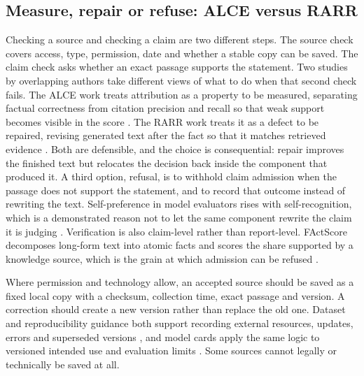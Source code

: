 \subsection{Measure, repair or refuse: ALCE versus RARR}

Checking a source and checking a claim are two different steps. The source check covers access,
type, permission, date and whether a stable copy can be saved. The claim check asks whether an
exact passage supports the statement. Two studies by overlapping authors take different views of
what to do when that second check fails. The ALCE work treats attribution as a property to be measured, separating factual
correctness from citation precision and recall so that weak support becomes visible in the score
\citep{gao2023alce}. The RARR work treats it as a defect to be repaired, revising generated text
after the fact so that it matches retrieved evidence \citep{gao2023rarr}. Both are defensible,
and the choice is consequential: repair improves the finished text but relocates the decision
back inside the component that produced it. A third option, refusal, is to withhold claim
admission when the passage does not support the statement, and to record that outcome instead of
rewriting the text. Self-preference in model evaluators rises with self-recognition, which is a
demonstrated reason not to let the same component rewrite the claim it is judging
\citep{panickssery2024selfpref,pineau2021reproducibility}. Verification is also claim-level
rather than report-level. FActScore decomposes long-form text into atomic facts and scores the
share supported by a knowledge source, which is the grain at which admission can be refused
\citep{min2023factscore,gao2023alce}.

Where permission and technology allow, an accepted source should be saved as a fixed local copy
with a checksum, collection time, exact passage and version. A correction should create a new
version rather than replace the old one. Dataset and reproducibility guidance both support
recording external resources, updates, errors and superseded versions
\citep{gebru2021datasheets,pineau2021reproducibility}, and model cards apply the same logic to
versioned intended use and evaluation limits \citep{mitchell2019modelcards}. Some sources cannot
legally or technically be saved at all.

